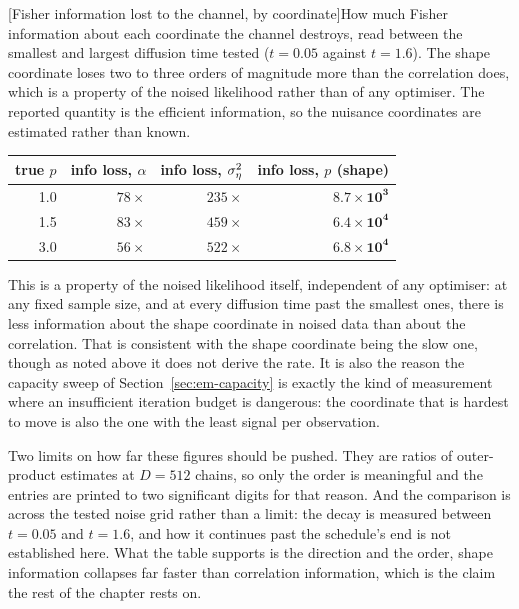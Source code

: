 \begin{center}
\begin{minipage}{\linewidth}\centering
{}[Fisher information lost to the channel, by coordinate]{How much Fisher information about each coordinate the channel destroys, read between the smallest and largest diffusion time tested ($t = 0.05$ against $t = 1.6$). The shape coordinate loses two to three orders of magnitude more than the correlation does, which is a property of the noised likelihood rather than of any optimiser. The reported quantity is the efficient information, so the nuisance coordinates are estimated rather than known.}
\label{tab:em-information}
\begin{tabular}{@{}rrrr@{}}
\toprule
true $p$ & info loss, $\alpha$ & info loss, $\sigma_\eta^2$ & info loss, $p$ (shape) \\
\midrule
1.0 & $78\times$ & $235\times$ & $\mathbf{8.7\times10^{3}}$ \\
1.5 & $83\times$ & $459\times$ & $\mathbf{6.4\times10^{4}}$ \\
3.0 & $56\times$ & $522\times$ & $\mathbf{6.8\times10^{4}}$ \\
\bottomrule
\end{tabular}
\end{minipage}
\end{center}
\noindent This is a property of the noised likelihood itself, independent of
any optimiser: at any fixed sample size, and at every diffusion time past the
smallest ones, there is less information about the shape coordinate in noised
data than about the correlation. That is consistent with the shape coordinate
being the slow one, though as noted above it does not derive the rate. It is also the reason
the capacity sweep of Section~\ref{sec:em-capacity} is exactly the kind of
measurement where an insufficient iteration budget is dangerous: the
coordinate that is hardest to move is also the one with the least signal per
observation.

Two limits on how far these figures should be pushed. They are ratios of
outer-product estimates at $D=512$ chains, so only the order is meaningful
and the entries are printed to two significant digits for that reason. And the
comparison is across the tested noise grid rather than a limit: the decay
is measured between $t=0.05$ and $t=1.6$, and how it continues past the
schedule's end is not established here. What the table supports is the
direction and the order, shape information collapses far faster than
correlation information, which is the claim the rest of the chapter
rests on.

